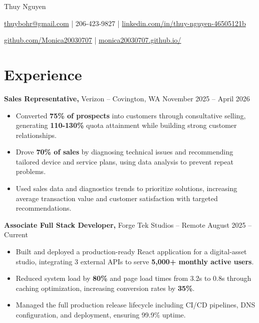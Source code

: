 \documentclass[11pt]{article}
\begin{document}
\centerline{\Huge Thuy Nguyen}

\vspace{5pt}

\centerline{\href{mailto:thuybohr@gmail.com}{thuybohr@gmail.com} | 206-423-9827 |
\href{https://www.linkedin.com/in/thuy-nguyen-46505121b/}{linkedin.com/in/thuy-nguyen-46505121b}}

\centerline{\href{https://github.com/Monica20030707}{github.com/Monica20030707} |
\href{https://monica20030707.github.io/}{monica20030707.github.io/}}

\vspace{-9pt}

\section*{Experience}

\textbf{Sales Representative,} {Verizon} -- Covington, WA \hfill November 2025 -- April 2026
\vspace{-9pt}
\begin{itemize}
  \item Converted \textbf{75\% of prospects} into customers through consultative selling, generating \textbf{110-130\%} quota attainment while building strong customer relationships.
  \item Drove \textbf{70\% of sales} by diagnosing technical issues and recommending tailored device and service plans, using data analysis to prevent repeat problems.
  \item Used sales data and diagnostics trends to prioritize solutions, increasing average transaction value and customer satisfaction with targeted recommendations.
\end{itemize}

\textbf{Associate Full Stack Developer,} {Forge Tek Studios} -- Remote \hfill August 2025 -- Current
\vspace{-9pt}
\begin{itemize}
  \item Built and deployed a production-ready React application for a digital-asset studio, integrating 3 external APIs to serve \textbf{5,000+ monthly active users}.
  \item Reduced system load by \textbf{80\%} and page load times from 3.2s to 0.8s through caching optimization, increasing conversion rates by \textbf{35\%}.
  \item Managed the full production release lifecycle including CI/CD pipelines, DNS configuration, and deployment, ensuring 99.9\% uptime.
\end{itemize}
\end{document}
